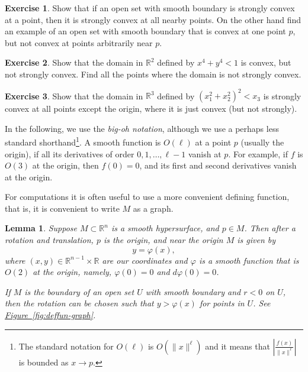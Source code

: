\documentclass[12pt,openany]{book}
\newcommand{\snorm}[1]{\lVert {#1} \rVert}
\newcommand{\abs}[1]{\left\lvert {#1} \right\rvert}
\newcommand{\R}{{\mathbb{R}}}
\newcommand{\myindex}[1]{#1\index{#1}}
\theoremstyle{plain}
\newtheorem{lemma}[thm]{Lemma}
\theoremstyle{remark}
\theoremstyle{definition}
\newenvironment{exbox}{%
    \def\FrameCommand{\vrule width 1pt \relax\hspace{10pt}}%
    \MakeFramed{\advance\hsize-\width\FrameRestore}%
}{%
    \endMakeFramed
}
\theoremstyle{exercise}
\newtheorem{exercise}{Exercise}[section]
\theoremstyle{example}
\newcommand{\figureref}[1]{\hyperref[#1]{Figure~\ref*{#1}}}
\begin{document}
\begin{exbox}
\begin{exercise}
Show that if an open set with smooth boundary is strongly convex at a point, then it is
strongly convex at all nearby points.  On the other hand find an example of
an open set with smooth boundary that is convex at one point $p$, but not convex at points
arbitrarily near $p$.
\end{exercise}

\begin{exercise}
Show that the domain in $\R^2$ defined by $x^4+y^4 < 1$ is convex, but not strongly convex.
Find all the points where the domain is not strongly convex.
\end{exercise}

\begin{exercise}
Show that the domain in $\R^3$ defined by ${(x_1^2+x_2^2)}^2 < x_3$ is
strongly convex at all points except the origin, where it is just convex
(but not strongly).
\end{exercise}
\end{exbox}

In the following, %
we use the \emph{\myindex{big-oh notation}},
although we use a perhaps less standard shorthand\footnote{%
The standard notation for $O(\ell)$ is $O(\snorm{x}^{\ell})$ and
it means that
$\abs{\frac{f(x)}{\snorm{x}^\ell}}$ is bounded as $x \to p$.}.
A smooth function is $O(\ell)$ at a point $p$ (usually the origin),
if all its derivatives of order $0, 1, \ldots,  \ell-1$ vanish at $p$.
For example, if $f$ is $O(3)$ at the origin,
then $f(0)=0$, and its first and second derivatives vanish at the origin.

For computations it is often useful to use a more convenient
defining function, that is, it is convenient to write $M$ as a graph.

\begin{lemma} \label{lemma:realgraphcoords}
Suppose $M \subset \R^n$ is a smooth hypersurface,
and $p \in M$.  Then after a rotation and translation,
$p$ is the origin, and near the origin $M$ is given by
\begin{equation*}
y = \varphi(x) ,
\end{equation*}
where $(x,y) \in \R^{n-1} \times \R$ are our coordinates and
$\varphi$ is a smooth
function that is $O(2)$ at the origin,
namely, $\varphi(0) = 0$ and $d\varphi(0) = 0$.

\nopagebreak
If $M$ is the boundary of an open set $U$ with smooth boundary and
$r < 0$ on $U$,
then the rotation can be chosen
such that $y > \varphi(x)$ for points in $U$.
See \figureref{fig:deffun-graph}.
\end{lemma}
\end{document}
